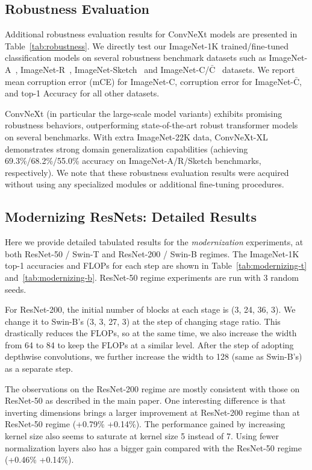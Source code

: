 \subsection{Robustness Evaluation}
\label{sec:robustness}
Additional robustness evaluation results for ConvNeXt models are presented in Table~\ref{tab:robustness}. We directly test our ImageNet-1K trained/fine-tuned classification models on several robustness benchmark datasets such as ImageNet-A~\cite{hendrycks2021natural}, ImageNet-R~\cite{hendrycks2021many}, ImageNet-Sketch~\cite{wang2019learning} and ImageNet-C/$\bar{\text{C}}$~\cite{hendrycks2018benchmarking, mintun2021interaction} datasets. We report mean corruption error (mCE) for ImageNet-C, corruption error for ImageNet-$\bar{\text{C}}$, and top-1 Accuracy for all other datasets. 

ConvNeXt (in particular the large-scale model variants) exhibits promising robustness behaviors, outperforming state-of-the-art robust transformer models~\cite{mao2021towards} on several benchmarks. With extra ImageNet-22K data, ConvNeXt-XL demonstrates strong domain generalization capabilities (\eg achieving 69.3\%/68.2\%/55.0\% accuracy on ImageNet-A/R/Sketch benchmarks, respectively). We note that these robustness evaluation results were acquired without using any specialized modules or additional fine-tuning procedures.
 


\subsection{Modernizing ResNets: Detailed Results}
\label{sec:modernizing_result}
Here we provide detailed tabulated results for the \emph{modernization} experiments, at both ResNet-50 / Swin-T and ResNet-200 / Swin-B regimes. The ImageNet-1K top-1 accuracies and FLOPs for each step are shown in Table~\ref{tab:modernizing-t} and~\ref{tab:modernizing-b}. ResNet-50 regime experiments are run with 3 random seeds.

For ResNet-200, the initial number of blocks at each stage is (3, 24, 36, 3). We change it to Swin-B's (3, 3, 27, 3) at the step of changing stage ratio. This drastically reduces the FLOPs, so at the same time, we also increase the width from 64 to 84 to keep the FLOPs at a similar level. After the step of adopting depthwise convolutions, we further increase the width to 128 (same as Swin-B's) as a separate step. 

The observations on the ResNet-200 regime are mostly consistent with those on ResNet-50 as described in the main paper. One interesting difference is that inverting dimensions brings a larger improvement at ResNet-200 regime than at ResNet-50 regime (+0.79\% \vs +0.14\%). The performance gained by increasing kernel size also seems to saturate at kernel size 5 instead of 7. Using fewer normalization layers also has a bigger gain compared with the ResNet-50 regime (+0.46\% \vs +0.14\%).





